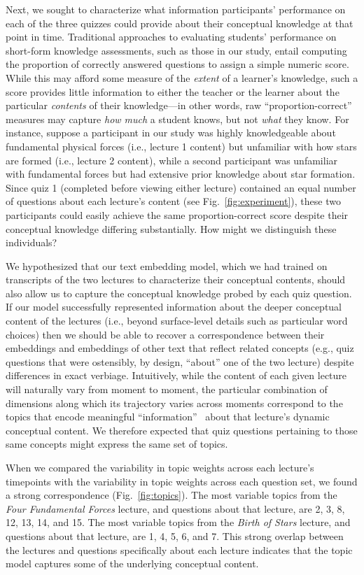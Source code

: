 \documentclass[10pt]{article}
\begin{document}
Next, we sought to characterize what information participants' performance on each of the three quizzes could provide about their conceptual knowledge at that point in time. Traditional approaches to evaluating students' performance on short-form knowledge assessments, such as those in our study, entail computing the proportion of correctly answered questions to assign a simple numeric score. While this may afford some measure of the \textit{extent} of a learner's knowledge, such a score provides little information to either the teacher or the learner about the particular \textit{contents} of their knowledge---in other words, raw ``proportion-correct'' measures may capture \textit{how much} a student knows, but not \textit{what} they know. For instance, suppose a participant in our study was highly knowledgeable about fundamental physical forces (i.e., lecture 1 content) but unfamiliar with how stars are formed (i.e., lecture 2 content), while a second participant was unfamiliar with fundamental forces but had extensive prior knowledge about star formation. Since quiz 1 (completed before viewing either lecture) contained an equal number of questions about each lecture's content (see Fig.~\ref{fig:experiment}), these two participants could easily achieve the same proportion-correct score despite their conceptual knowledge differing substantially. How might we distinguish these individuals?

We hypothesized that our text embedding model, which we had trained on transcripts of the two lectures to characterize their conceptual contents, should also allow us to capture the conceptual knowledge probed by each quiz question. If our model successfully represented information about the deeper conceptual content of the lectures (i.e., beyond surface-level details such as particular word choices) then we should be able to recover a correspondence between their embeddings and embeddings of other text that reflect related concepts (e.g., quiz questions that were ostensibly, by design, ``about'' one of the two lecture) despite differences in exact verbiage. Intuitively, while the content of each given lecture will naturally vary from moment to moment, the particular combination of dimensions along which its trajectory varies across moments correspond to the topics that encode meaningful ``information''~\citep{Fish22}  about that lecture's dynamic conceptual content. We therefore expected that quiz questions pertaining to those same concepts might express the same set of topics.

When we compared the variability in topic
weights across each lecture's timepoints with the variability in topic weights
across each question set, we found a strong correspondence
(Fig.~\ref{fig:topics}). The most variable topics from the \textit{Four
Fundamental Forces} lecture, and questions about that lecture, are 2, 3, 8, 12,
13, 14, and 15. The most variable topics from the \textit{Birth of Stars}
lecture, and questions about that lecture, are 1, 4, 5, 6, and 7. This strong
overlap between the lectures and questions specifically about each lecture
indicates that the topic model captures some of the underlying conceptual
content.
\end{document}
